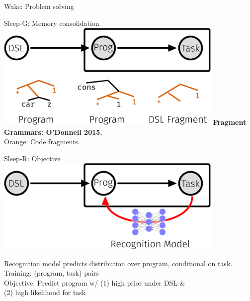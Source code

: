 \documentclass{beamer}
\begin{document}
\begin{frame}[t]{Wake: Problem solving}
{}

\end{frame}
\begin{frame}[t]{Sleep-G: Memory consolidation}
  \includegraphics[width = 11cm]{figures/animation/Sleep-G.eps}
  \vfill
  \textbf{Fragment Grammars: O'Donnell 2015.}\\
  Orange: Code fragments.\\

  
\end{frame}
\begin{frame}[t]{Sleep-R: Objective}
  \includegraphics[width = 11cm]{figures/animation/Wake.eps}

    \vfill
    Recognition model predicts distribution over program, conditional on task.\\
    Training: (program, task) pairs\\
    Objective: Predict program w/ (1) high prior under DSL \& \\(2) high likelihood for task

\end{frame}
\end{document}
